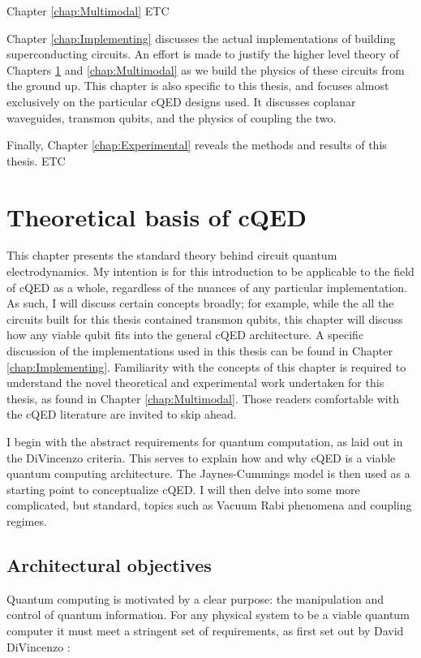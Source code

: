 \documentclass[11 pt, oneside]{book} %
\begin{document}
Chapter \ref{chap:Multimodal} ETC

Chapter \ref{chap:Implementing} discusses the actual implementations of building superconducting circuits. An effort is made to justify the higher level theory of Chapters \ref{chap:Theoretical} and \ref{chap:Multimodal} as we build the physics of these circuits from the ground up. This chapter is also specific to this thesis, and focuses almost exclusively on the particular cQED designs used. It discusses coplanar waveguides, transmon qubits, and the physics of coupling the two. 

Finally, Chapter \ref{chap:Experimental} reveals the methods and results of this thesis. ETC



\chapter{Theoretical basis of cQED}\label{chap:Theoretical}
This chapter presents the standard theory behind circuit quantum electrodynamics. My intention is for this introduction to be applicable to the field of cQED as a whole, regardless of the nuances of any particular implementation. As such, I will discuss certain concepts broadly; for example, while the all the circuits built for this thesis contained transmon qubits, this chapter will discuss how any viable qubit fits into the general cQED architecture. A specific discussion of the implementations used in this thesis can be found in Chapter \ref{chap:Implementing}. Familiarity with the concepts of this chapter is required to understand the novel theoretical and experimental work undertaken for this thesis, as found in Chapter \ref{chap:Multimodal}. Those readers comfortable with the cQED literature are invited to skip ahead. 

I begin with the abstract requirements for quantum computation, as laid out in the DiVincenzo criteria. This serves to explain how and why cQED is a viable quantum computing architecture. The Jaynes-Cummings model is then used as a starting point to conceptualize cQED. I will then delve into some more complicated, but standard, topics such as Vacuum Rabi phenomena and coupling regimes.

\section{Architectural objectives}\label{sec:DiVincenzo}
Quantum computing is motivated by a clear purpose: the manipulation and control of quantum information. For any physical system to be a viable quantum computer it must meet a stringent set of requirements, as first set out by David DiVincenzo \cite{DiVincenzo}:
\end{document}
